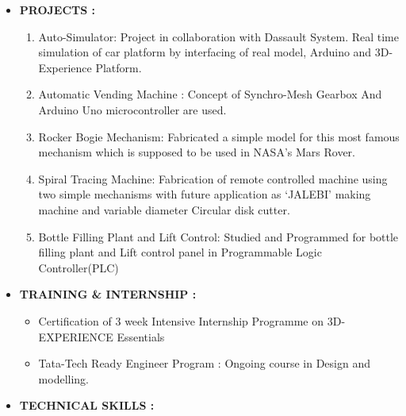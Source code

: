\documentclass[11pt]{article}
\begin{document}
\begin{itemize}[label=$\star$]
\begin{flushleft}
\begin{tabular}{|c|c|c|c|c|}
			\end{tabular}
		\end{flushleft}
		\bigskip
		\item	\begin{large} \textbf{PROJECTS :} \end{large}
		\begin{enumerate}
			\itemsep0em
			\item Auto-Simulator: Project in collaboration with Dassault System. Real time simulation of car platform by interfacing of real model, Arduino and 3D-Experience Platform. 
			\item Automatic Vending Machine : Concept of Synchro-Mesh Gearbox And Arduino Uno microcontroller are used.
			\item Rocker Bogie Mechanism: Fabricated a simple model for this most famous mechanism which is supposed to be used in NASA’s Mars Rover.
			\item Spiral Tracing Machine: Fabrication of remote controlled machine using two simple mechanisms with future application as ‘JALEBI’ making machine and variable diameter Circular disk cutter.
			\item Bottle Filling Plant and Lift Control: Studied and Programmed for bottle filling plant and Lift control panel in Programmable Logic Controller(PLC)
		\end{enumerate}
		\newpage
		\item	\begin{large} \textbf{TRAINING \& INTERNSHIP :} \end{large}
		\begin{itemize}[label=$\bullet$]
			\itemsep0em
			\item Certification of 3 week Intensive Internship Programme on 3D-EXPERIENCE Essentials 
			\item Tata-Tech Ready Engineer Program : Ongoing course in Design and modelling.
		\end{itemize}
		\bigskip
		\item	\begin{large} \textbf{TECHNICAL SKILLS :} \end{large}

\end{itemize}
\end{document}
